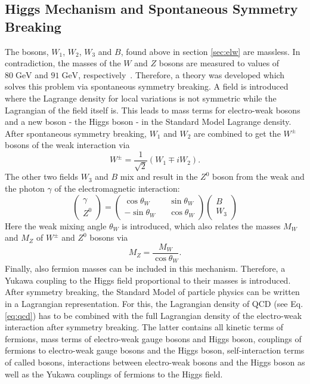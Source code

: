 	\subsection{Higgs Mechanism and Spontaneous Symmetry Breaking}
	\label{sec:higgs}
	The bosons, $W_1$, $W_2$, $W_3$ and $B$, found above in section \ref{sec:elw} are massless. In contradiction, the masses of the $W$ and $Z$ bosons are measured to values of $80\;\text{GeV}$ and $91\;\text{GeV}$, respectively~\cite{pdg2016}. Therefore, a theory was developed which solves this problem via spontaneous symmetry breaking. A field is introduced where the Lagrange density for local variations is not symmetric while the Lagrangian of the field itself is. This leads to mass terms for electro-weak bosons and a new boson - the Higgs boson - in the Standard Model Lagrange density. After spontaneous symmetry breaking, $W_1$ and $W_2$ are combined to get the $W^\pm$ bosons of the weak interaction via
	\begin{equation}
	W^\pm = \frac{1}{\sqrt{2}}(W_1 \mp i W_2).
	\label{eq:W}
	\end{equation}
	The other two fields $W_3$ and $B$ mix and result in the $Z^0$ boson from the weak and the photon $\gamma$ of the electromagnetic interaction:
	\begin{equation}
	\begin{pmatrix}\gamma \\ Z^0\end{pmatrix} =
	\begin{pmatrix}
	\cos \theta_W && \sin \theta_W \\
	-\sin \theta_W && \cos \theta_W 
	\end{pmatrix}
	\begin{pmatrix}B \\ W_3\end{pmatrix}
	\label{eq:Z}
	\end{equation}	
	Here the weak mixing angle $\theta_W$ is introduced, which also relates the masses $M_W$ and $M_Z$ of $W^\pm$ and $Z^0$ bosons via
	\begin{equation}
	M_Z = \frac{M_W}{\cos \theta_W}.
	\end{equation}
	Finally, also fermion masses can be included in this mechanism. Therefore, a Yukawa coupling to the Higgs field proportional to their masses is introduced. After symmetry breaking, the Standard Model of particle physics can be written in a Lagrangian representation. For this, the Lagrangian density of QCD (see Eq. \ref{eq:qcd}) has to be combined with the full Lagrangian density of the electro-weak interaction after symmetry breaking. The latter contains all kinetic terms of fermions, mass terms of electro-weak gauge bosons and Higgs boson, couplings of fermions to electro-weak gauge bosons and the Higgs boson, self-interaction terms of called bosons, interactions between electro-weak bosons and the Higgs boson as well as the Yukawa couplings of fermions to the Higgs field.

